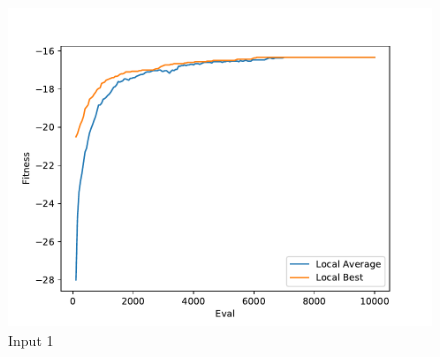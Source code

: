 \documentclass{standalone}
\begin{document}
\begin{figure}[!htb]
	\caption{Input 1}
	\label{fig:graph_1015}
	\includegraphics[width=\textwidth]{../graphs/graphs/1015.pdf}
\end{figure}
\end{document}
